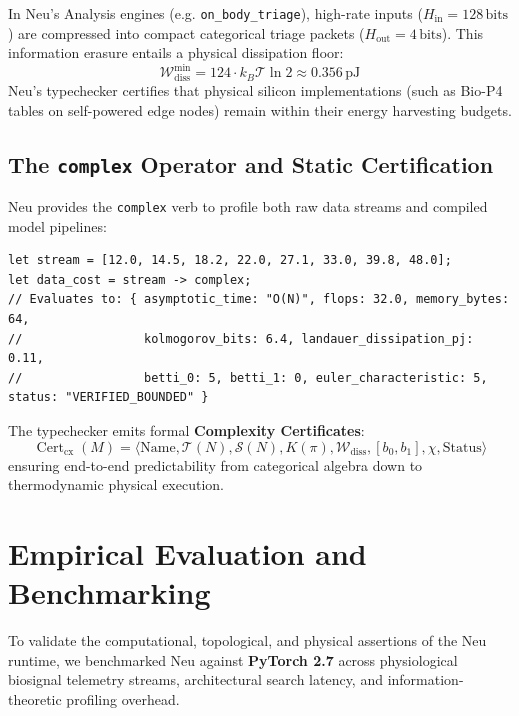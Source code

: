 \documentclass[11pt]{article}
\begin{document}
In Neu's Analysis engines (e.g. \texttt{on\_body\_triage}), high-rate inputs ($H_{\text{in}} = 128\,\text{bits}$) are compressed into compact categorical triage packets ($H_{\text{out}} = 4\,\text{bits}$). This information erasure entails a physical dissipation floor:
\begin{equation}
\mathcal{W}_{\text{diss}}^{\min} = 124 \cdot k_B \mathcal{T} \ln 2 \approx 0.356\,\text{pJ}
\end{equation}
Neu's typechecker certifies that physical silicon implementations (such as Bio-P4 tables on self-powered edge nodes) remain within their energy harvesting budgets.

\subsection{The \texttt{complex} Operator and Static Certification}
Neu provides the \texttt{complex} verb to profile both raw data streams and compiled model pipelines:
\begin{lstlisting}[language=neu]
let stream = [12.0, 14.5, 18.2, 22.0, 27.1, 33.0, 39.8, 48.0];
let data_cost = stream -> complex;
// Evaluates to: { asymptotic_time: "O(N)", flops: 32.0, memory_bytes: 64,
//                 kolmogorov_bits: 6.4, landauer_dissipation_pj: 0.11,
//                 betti_0: 5, betti_1: 0, euler_characteristic: 5, status: "VERIFIED_BOUNDED" }
\end{lstlisting}

The typechecker emits formal \textbf{Complexity Certificates}:
\begin{equation}
\operatorname{Cert}_{\text{cx}}(M) = \big\langle \text{Name}, \mathcal{T}(N), \mathcal{S}(N), K(\pi), \mathcal{W}_{\text{diss}}, [b_0, b_1], \chi, \text{Status} \big\rangle
\end{equation}
ensuring end-to-end predictability from categorical algebra down to thermodynamic physical execution.

\section{Empirical Evaluation and Benchmarking}

To validate the computational, topological, and physical assertions of the Neu runtime, we benchmarked Neu against \textbf{PyTorch 2.7} across physiological biosignal telemetry streams, architectural search latency, and information-theoretic profiling overhead.
\end{document}
